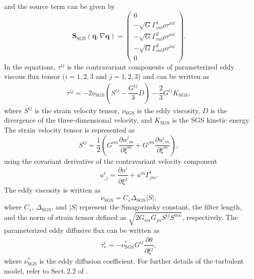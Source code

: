 and 
the source term can be given by 
\begin{equation}
  \bm{S}_\textrm{SGS}(\bm{q},\nabla \bm{q}) = \begin{pmatrix}
    0 \\
    -\sqrt{G} \Gamma^1_{ml}\rho \tau^{ml}  \\
    -\sqrt{G} \Gamma^2_{ml}\rho \tau^{ml}  \\
    -\sqrt{G} \Gamma^3_{ml}\rho \tau^{ml}  \\
    0
    \end{pmatrix}.
\end{equation}
In the equations, 
$\tau^{ij}$ is the contravariant components of parameterized eddy viscous flux tensor 
($i=1,2,3$ and $j=1,2,3$) and can be written as 
\begin{eqnarray}
  \tau^{ij} = - 2 \nu_\textrm{SGS}
   \left( 
    S^{ij} - \dfrac{G^{ij}}{3} D
   \right)
   - \dfrac{2}{3} G^{ij} K_\textrm{SGS}, 
\end{eqnarray} 
where
$S^{ij}$ is the strain velocity tensor, 
$\nu_\textrm{SGS}$ is the eddy viscosity, 
$D$ is the divergence of the three-dimensional velocity, 
and 
$K_\textrm{SGS}$ is the SGS kinetic energy. 
The strain velocity tensor is represented as  
\begin{equation}
  S^{ij} = \dfrac{1}{2} 
  \left( G^{im} \dfrac{\partial u^j_{,m}}{\partial \xi^m} + G^{jm} \dfrac{\partial u^i_{,m}}{\partial \xi^m} \right), 
\end{equation}
using the covariant derivative of the contravariant velocity component 
\begin{equation}
  u^i_{,j} = \dfrac{\partial u^i}{\partial \xi^j} + u^m \Gamma^i_{jm}.
\end{equation}
The eddy viscosity is written as 
\begin{equation}
  \nu_\textrm{SGS} 
 = C_s \Delta_\textrm{SGS} |S|, 
\end{equation}
where 
$C_s$, $\Delta_\textrm{SGS}$, 
and $|S|$ represent the Smagorinsky constant, 
the filter length, 
and the norm of strain tensor defined as $\sqrt{2 G_{im}G_{jn}S^{ij}S^{mn}}$, respectively.
The parameterized eddy diffusive flux can be written 
as 
\begin{eqnarray}
  \tau_*^{i} = - \nu^*_\textrm{SGS} G^{ij} \dfrac{\partial \theta}{\partial \xi^j}, 
\end{eqnarray}
where 
$\nu^*_\textrm{SGS}$ is the eddy diffusion coefficient.  
For further details of the turbulent model, 
refer to Sect.\,2.2 of \cite{nishizawa2015influence}. 

